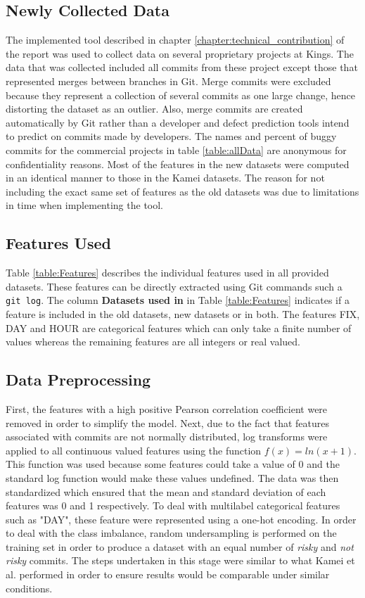 \documentclass[../main.tex]{subfiles}
\begin{document}
\subsection{Newly Collected Data}

The implemented tool described in chapter \ref{chapter:technical_contribution} of the report was used to collect data on several proprietary projects at Kings. The data that was collected included all commits from these project except those that represented merges between branches in Git. Merge commits were excluded because they represent a collection of several commits as one large change, hence distorting the dataset as an outlier. Also, merge commits are created automatically by Git rather than a developer and defect prediction tools intend to predict on commits made by developers. The names and percent of buggy commits for the commercial projects in table \ref{table:allData} are anonymous for confidentiality reasons. Most of the features in the new datasets were computed in an identical manner to those in the Kamei datasets. The reason for not including the exact same set of features as the old datasets was due to limitations in time when implementing the tool. 

\subsection{Features Used}

Table \ref{table:Features} describes the individual features used in all provided datasets. These features can be directly extracted using Git commands such a \texttt{git log}. The column \textbf{Datasets used in} in Table \ref{table:Features} indicates if a feature is included in the old datasets, new datasets or in both. The features FIX, DAY and HOUR are categorical features which can only take a finite number of values whereas the remaining features are all integers or real valued. 

\subsection{Data Preprocessing}

First, the features with a high positive Pearson correlation coefficient were removed in order to simplify the model. Next, due to the fact that features associated with commits are not normally distributed, log transforms were applied to all continuous valued features using the function $f(x) = ln(x+1)$. This function was used because some features could take a value of 0 and the standard log function would make these values undefined. The data was then standardized which ensured that the mean and standard deviation of each features was 0 and 1 respectively. To deal with multilabel categorical features such as "DAY", these feature were represented using a one-hot encoding. In order to deal with the class imbalance, random undersampling is performed on the training set in order to produce a dataset with an equal number of \textit{risky} and \textit{not risky} commits. The steps undertaken in this stage were similar to what Kamei et al. performed \cite{kamei2013large} in order to ensure results would be comparable under similar conditions. 
\end{document}
